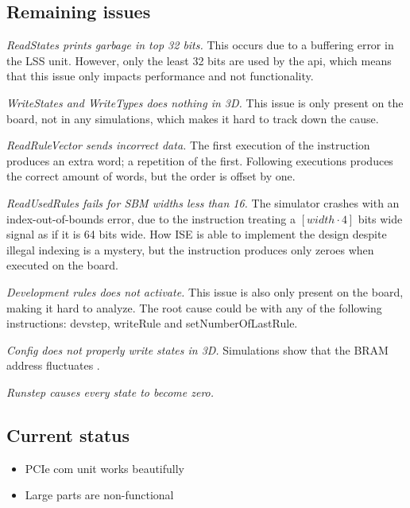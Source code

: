 \subsection{Remaining issues}

\emph{ReadStates prints garbage in top 32 bits.}
This occurs due to a buffering error in the LSS unit.
However, only the least 32 bits are used by the api, which means that this issue only impacts performance and not functionality.

\emph{WriteStates and WriteTypes does nothing in 3D.}
This issue is only present on the board, not in any simulations, which makes it hard to track down the cause.

\emph{ReadRuleVector sends incorrect data.}
The first execution of the instruction produces an extra word; a repetition of the first.
Following executions produces the correct amount of words, but the order is offset by one.

\emph{ReadUsedRules fails for SBM widths less than 16.}
The simulator crashes with an index-out-of-bounds error, due to the instruction treating a $[width\cdot4]$ bits wide signal as if it is 64 bits wide.
How ISE is able to implement the design despite illegal indexing is a mystery, but the instruction produces only zeroes when executed on the board.

\emph{Development rules does not activate.}
This issue is also only present on the board, making it hard to analyze.
The root cause could be with any of the following instructions: devstep, writeRule and setNumberOfLastRule.

\emph{Config does not properly write states in 3D.}
Simulations show that the BRAM address fluctuates \TODO.

\emph{Runstep causes every state to become zero.}
\TODO

\subsection{Current status}

\TODO

\begin{itemize}
    \item PCIe com unit works beautifully
    \item Large parts are non-functional
\end{itemize}


